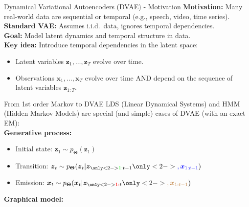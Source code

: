 \documentclass{beamer}
\def\vs1{\vspace{1mm}}
\newcommand{\bs}[1]{\boldsymbol{#1}}
\begin{document}
\begin{frame}{Dynamical Variational Autoencoders (DVAE) - Motivation}
\textbf{Motivation:} Many real-world data are sequential or temporal (e.g., speech, video, time series).\\
\vs1
\textbf{Standard VAE:} Assumes i.i.d.\ data, ignores temporal dependencies.\\
\vs1
\textbf{Goal:} Model latent dynamics and temporal structure in data.\\
\vs1
\textbf{Key idea:} Introduce temporal dependencies in the latent space:
\begin{itemize}
  \item Latent variables $\bs{z}_1, \ldots, \bs{z}_T$ evolve over time.
  \item Observations $\bs{x}_1, \ldots, \bs{x}_T$ evolve over time AND depend on the sequence of latent variables $\bs{z}_{1:T}$.
\end{itemize}
\end{frame}

\begin{frame}{From 1st order Markov to DVAE}
LDS (Linear Dynamical Systems) and HMM (Hidden Markov Models) are special (and simple) cases of DVAE (with an exact EM):\vspace{3mm}\\
\textbf{Generative process:}
\begin{itemize}
  \item Initial state: $\bs{z}_1 \sim p_{\bs{\Theta}}(\bs{z}_1)$
  \item Transition: $\bs{z}_t \sim p_{\bs{\Theta}}(\bs{z}_t|\bs{z}_{\only<2->{{\color{green}1:}}t-1}\only<2->{{\color{blue},\bs{x}_{1:t-1}}})$
  \item Emission: $\bs{x}_t \sim p_{\bs{\Theta}}(\bs{x}_t|\bs{z}_{\only<2->{{\color{red}1:}}t}\only<2->{{\color{brown},\bs{x}_{1:t-1}}})$
\end{itemize}\vspace{3mm}

\textbf{Graphical model:}\vspace{1mm}\\
\end{frame}
\end{document}
